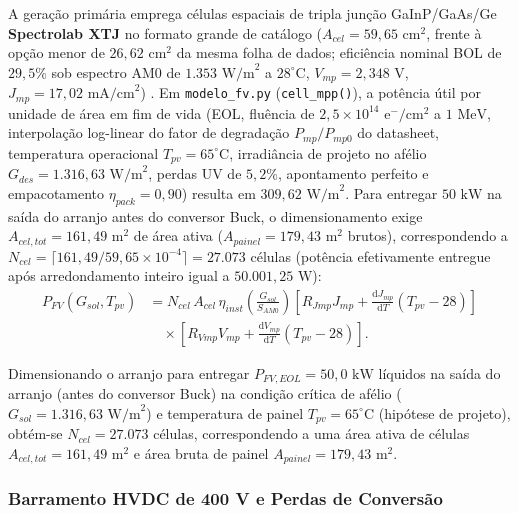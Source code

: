 A geração primária emprega células espaciais de tripla junção GaInP/GaAs/Ge \textbf{Spectrolab XTJ} no formato grande de catálogo ($A_{cel} = 59{,}65\text{ cm}^2$, frente à opção menor de $26{,}62\text{ cm}^2$ da mesma folha de dados; eficiência nominal BOL de $29{,}5\%$ sob espectro AM0 de $1.353\text{ W/m}^2$ a $28^\circ\text{C}$, $V_{mp} = 2{,}348\text{ V}$, $J_{mp} = 17{,}02\text{ mA/cm}^2$) \cite{spectrolab_xtj_prime}. Em \texttt{modelo\_fv.py} (\texttt{cell\_mpp()}), a potência útil por unidade de área em fim de vida (EOL, fluência de $2{,}5 \times 10^{14}\text{ e}^-/\text{cm}^2$ a $1\text{ MeV}$, interpolação log-linear do fator de degradação $P_{mp}/P_{mp0}$ do datasheet, temperatura operacional $T_{pv} = 65^\circ\text{C}$, irradiância de projeto no afélio $G_{des} = 1.316{,}63\text{ W/m}^2$, perdas UV de $5{,}2\%$, apontamento perfeito e empacotamento $\eta_{pack} = 0{,}90$) resulta em $309{,}62\text{ W/m}^2$. Para entregar $50\text{ kW}$ na saída do arranjo antes do conversor Buck, o dimensionamento exige $A_{cel,tot} = 161{,}49\text{ m}^2$ de área ativa ($A_{painel} = 179{,}43\text{ m}^2$ brutos), correspondendo a $N_{cel} = \lceil 161{,}49 / 59{,}65\times 10^{-4} \rceil = 27.073$ células (potência efetivamente entregue após arredondamento inteiro igual a $50.001{,}25\text{ W}$):
\begin{equation}
\begin{split}
    P_{FV}(G_{sol}, T_{pv}) &= N_{cel} \, A_{cel} \, \eta_{inst} \left(\frac{G_{sol}}{S_{AM0}}\right)
    \left[R_{Jmp} J_{mp} + \frac{\mathrm{d}J_{mp}}{\mathrm{d}T}(T_{pv} - 28)\right] \\
    &\quad \times \left[R_{Vmp} V_{mp} + \frac{\mathrm{d}V_{mp}}{\mathrm{d}T}(T_{pv} - 28)\right].
\end{split}
    \label{eq:potencia_fv}
\end{equation}

Dimensionando o arranjo para entregar $P_{FV,EOL} = 50{,}0\text{ kW}$ líquidos na saída do arranjo (antes do conversor Buck) na condição crítica de afélio ($G_{sol} = 1.316{,}63\text{ W/m}^2$) e temperatura de painel $T_{pv} = 65^\circ\text{C}$ (hipótese de projeto), obtém-se $N_{cel} = 27.073$ células, correspondendo a uma área ativa de células $A_{cel,tot} = 161{,}49\text{ m}^2$ e área bruta de painel $A_{painel} = 179{,}43\text{ m}^2$.

\subsubsection{Barramento HVDC de 400 V e Perdas de Conversão}

